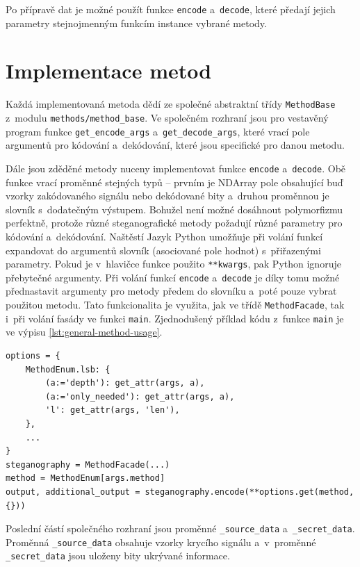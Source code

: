Po přípravě dat je možné použít funkce \texttt{encode} a~\texttt{decode}, které
předají jejich parametry stejnojmenným funkcím instance vybrané metody.

\section{Implementace metod}
\label{sec:method-implementation}

Každá implementovaná metoda dědí ze společné abstraktní třídy
\texttt{MethodBase} z~modulu \texttt{methods/method\_base}. Ve společném
rozhraní jsou pro vestavěný program funkce \texttt{get\_encode\_args}
a~\texttt{get\_decode\_args}, které vrací pole argumentů pro kódování
a~dekódování, které jsou specifické pro danou metodu.

Dále jsou zděděné metody nuceny implementovat funkce \texttt{encode}
a~\texttt{decode}. Obě funkce vrací proměnné stejných typů -- prvním je NDArray
pole obsahující buď vzorky zakódovaného signálu nebo dekódované bity a~druhou
proměnnou je slovník s~dodatečným výstupem. Bohužel není možné dosáhnout
polymorfizmu perfektně, protože různé steganografické metody požadují různé
parametry pro kódování a~dekódování. Naštěstí Jazyk Python umožňuje při volání
funkcí expandovat do argumentů slovník (asociované pole hodnot) s~přiřazenými
parametry. Pokud je v~hlavičce funkce použito \texttt{**kwargs}, pak Python
ignoruje přebytečné argumenty. Při volání funkcí \texttt{encode}
a~\texttt{decode} je díky tomu možné přednastavit argumenty pro metody předem
do slovníku a~poté pouze vybrat použitou metodu. Tato funkcionalita je využita,
jak ve třídě \texttt{MethodFacade}, tak i~při volání fasády ve funkci
\texttt{main}. Zjednodušený příklad kódu z~funkce \texttt{main} je ve výpisu
\ref{lst:general-method-usage}.

\begin{lstlisting}[language=PythonPlus, label={lst:general-method-usage},
caption={Zobecněné použití fasády a~steganografických metod.}]
options = {
    MethodEnum.lsb: {
        (a:='depth'): get_attr(args, a),
        (a:='only_needed'): get_attr(args, a),
        'l': get_attr(args, 'len'),
    },
    ...
}
steganography = MethodFacade(...)
method = MethodEnum[args.method]
output, additional_output = steganography.encode(**options.get(method, {}))
\end{lstlisting}

Poslední částí společného rozhraní jsou proměnné \texttt{\_source\_data}
a~\texttt{\_secret\_data}. Proměnná \texttt{\_source\_data} obsahuje vzorky
krycího signálu a~v~proměnné \texttt{\_secret\_data} jsou uloženy bity ukrývané
informace.

